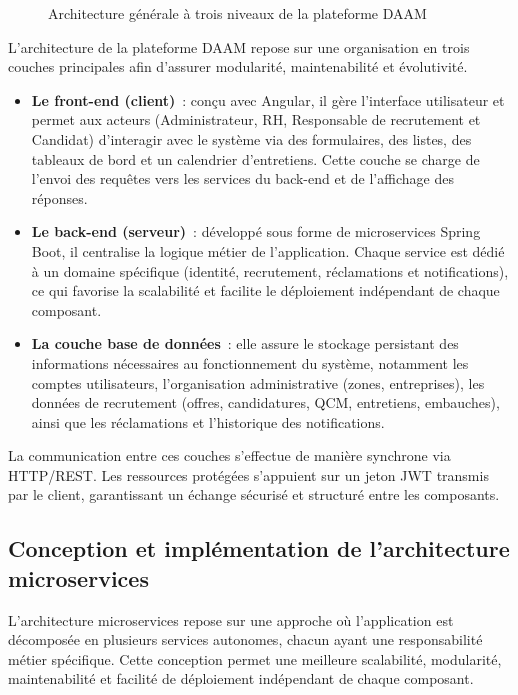 \begin{figure}[htbp]
  \centering
  \caption{Architecture générale à trois niveaux de la plateforme DAAM}
  \label{fig:arch-three-tiers}
\end{figure}

L'architecture de la plateforme DAAM repose sur une organisation en trois
couches principales afin d'assurer modularité, maintenabilité et
évolutivité.

\begin{itemize}
  \item \textbf{Le front-end (client)}~: conçu avec Angular, il gère
        l'interface utilisateur et permet aux acteurs (Administrateur, RH,
        Responsable de recrutement et Candidat) d'interagir avec le système
        via des formulaires, des listes, des tableaux de bord et un calendrier
        d'entretiens. Cette couche se charge de l'envoi des requêtes vers
        les services du back-end et de l'affichage des réponses.
  \item \textbf{Le back-end (serveur)}~: développé sous forme de
        microservices Spring Boot, il centralise la logique métier de
        l'application. Chaque service est dédié à un domaine
        spécifique (identité, recrutement, réclamations et notifications),
        ce qui favorise la scalabilité et facilite le déploiement
        indépendant de chaque composant.
  \item \textbf{La couche base de données}~: elle assure le stockage
        persistant des informations nécessaires au fonctionnement du
        système, notamment les comptes utilisateurs, l'organisation
        administrative (zones, entreprises), les données de recrutement
        (offres, candidatures, QCM, entretiens, embauches), ainsi que
        les réclamations et l'historique des notifications.
\end{itemize}

La communication entre ces couches s'effectue de manière synchrone via
HTTP/REST. Les ressources protégées s'appuient sur un jeton JWT transmis
par le client, garantissant un échange sécurisé et structuré entre
les composants.


\subsection{Conception et implémentation de l'architecture microservices}

L'architecture microservices repose sur une approche où l'application est
décomposée en plusieurs services autonomes, chacun ayant une
responsabilité métier spécifique. Cette conception permet une meilleure
scalabilité, modularité, maintenabilité et facilité de déploiement
indépendant de chaque composant.

